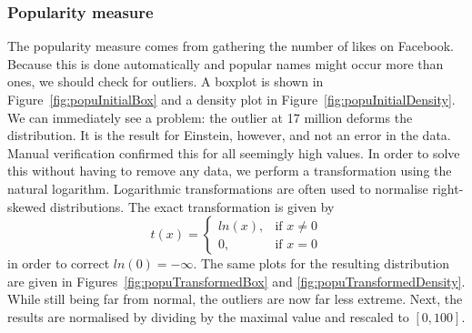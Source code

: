 \subsubsection{Popularity measure}
\label{sssec:popularity}
The popularity measure comes from gathering the number of likes on Facebook. Because this is done automatically and popular names might occur more than ones, we should check for outliers. A boxplot is shown in Figure~\ref{fig:popuInitialBox} and a density plot in Figure~\ref{fig:popuInitialDensity}. We can immediately see a problem: the outlier at 17 million deforms the distribution. It is the result for Einstein, however, and not an error in the data. Manual verification confirmed this for all seemingly high values. In order to solve this without having to remove any data, we perform a transformation using the natural logarithm. Logarithmic transformations are often used to normalise right-skewed distributions. The exact transformation is given by
\begin{equation}
\label{eq:logtransform}
t(x) = \begin{cases} ln(x), & \mbox{if } x \neq 0 \\ 0, & \mbox{if } x = 0 \end{cases}
\end{equation}
in order to correct $ln(0) = -\infty$. The same plots for the resulting distribution are given in Figures~\ref{fig:popuTransformedBox} and \ref{fig:popuTransformedDensity}. While still being far from normal, the outliers are now far less extreme. Next, the results are normalised by dividing by the maximal value and rescaled to $[0, 100]$.
